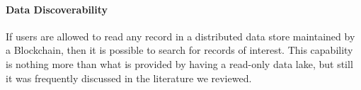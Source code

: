 
\paragraph{Data Discoverability}
If users are allowed to read any record in a distributed data store maintained 
by a Blockchain, then it is possible to search for records of interest.
This capability is nothing more than what is provided by having a read-only data lake, but still it was frequently discussed in the literature we reviewed.